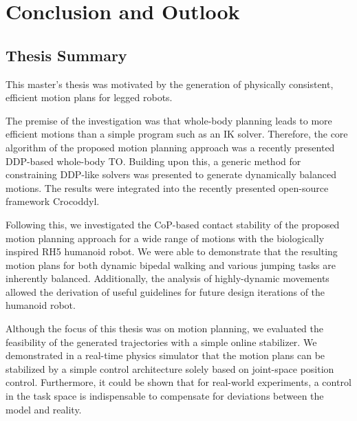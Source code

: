 
\chapter{Conclusion and Outlook}\label{c7}

\section{Thesis Summary}
This master's thesis was motivated by the generation of physically consistent, efficient motion plans for legged robots. 

The premise of the investigation was that whole-body planning leads to more efficient motions than a simple program such as an \gls{IK} solver. Therefore, the core algorithm of the proposed motion planning approach was a recently presented \gls{DDP}-based whole-body \gls{TO}. Building upon this, a generic method for constraining DDP-like solvers was presented to generate dynamically balanced motions. The results were integrated into the recently presented open-source framework Crocoddyl.

Following this, we investigated the \gls{CoP}-based contact stability of the  proposed motion planning approach for a wide range of motions with the biologically inspired RH5 humanoid robot. We were able to demonstrate that the resulting motion plans for both dynamic bipedal walking and various jumping tasks are inherently balanced. Additionally, the analysis of highly-dynamic movements allowed the derivation of useful guidelines for future design iterations of the humanoid robot.

Although the focus of this thesis was on motion planning, we evaluated the feasibility of the generated trajectories with a simple online stabilizer. We demonstrated in a real-time physics simulator that the motion plans can be stabilized by a simple control architecture solely based on joint-space position control. Furthermore, it could be shown that for real-world experiments, a control in the task space is indispensable to compensate for deviations between the model and reality. 

